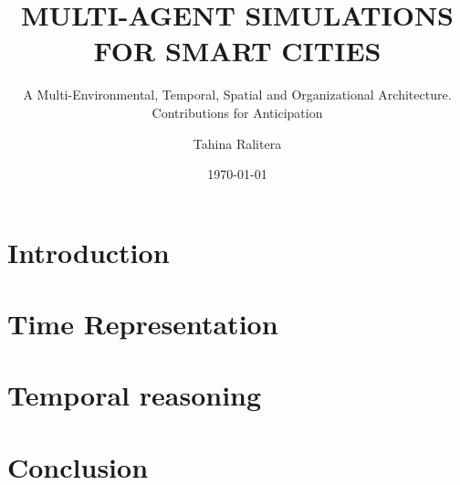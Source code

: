 \documentclass[9pt,notes]{beamer}
\title{\uppercase{Multi-Agent Simulations for Smart Cities}}
\subtitle{A Multi-Environmental, Temporal, Spatial and Organizational Architecture. Contributions for Anticipation}
\author{Tahina Ralitera}
\institute{\footnotesize{\textbf{Supervisor :} Pr. Rémy Courdier}\\ 
		\footnotesize{\textbf{Co-supervisor :} Dr. Denis Payet}}
\date{\today}
\begin{document}
\titlepage %

\section{Introduction}




%

\section{Time Representation}

\section{Temporal reasoning}

\section{Conclusion}




%
%

%
%
\end{document}
